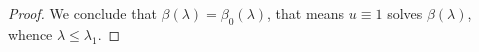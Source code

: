 \documentclass[reqno,11pt]{amsart}
\theoremstyle{definition}
\numberwithin{equation}{section}
\newcommand{\1}{{{\bf 1}\kern-0,28em\rm l}}
\begin{document}
\begin{proof}
We conclude  that $\beta(\lambda)=\beta_0(\lambda)$, that means $u\equiv 1$ solves $\beta(\lambda)$, whence $\lambda \le \lambda_1$. 



\end{proof}
\end{document}
